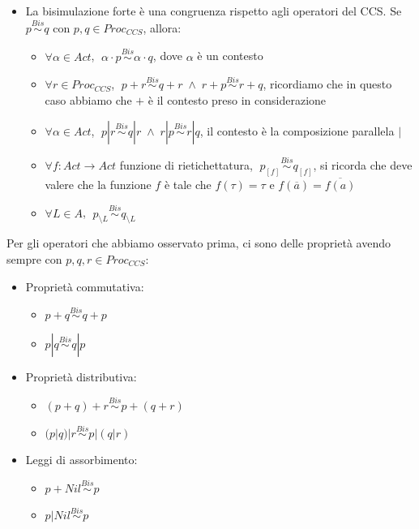 \begin{itemize}
    \item La bisimulazione forte è una congruenza rispetto agli operatori del CCS.
        Se $p \stackrel{Bis}{\sim} q$ con $p,q \in Proc_{CCS}$, allora: 
        \begin{itemize}
            \item $\forall \alpha \in Act$, $\; \alpha \cdot p \stackrel{Bis}{\sim} \alpha \cdot q$, dove $\alpha$ è un contesto
            \item $\forall r \in Proc_{CCS}$, $\; p + r \stackrel{Bis}{\sim} q +r \; \land \; r + p \stackrel{Bis}{\sim} r + q$, ricordiamo che in questo caso abbiamo che $+$ è il contesto preso in considerazione
            \item $\forall \alpha \in Act$, $\; p | r \stackrel{Bis}{\sim} q|r \; \land \; r | p \stackrel{Bis}{\sim} r | q$, il contesto è la composizione parallela $|$
            \item $\forall f : Act \to Act$ funzione di rietichettatura, $\; p_{[f]} \stackrel{Bis}{\sim} q_{[f]}$, si ricorda che deve valere che la funzione $f$ è tale che $f(\tau) = \tau$ e $f(\overline a) = \overline{f(a)}$
            \item $\forall L \in A$, $\; p_{\setminus L} \stackrel{Bis}{\sim} q_{\setminus L}$
        \end{itemize}
\end{itemize}
Per gli operatori che abbiamo osservato prima, ci sono delle proprietà avendo sempre con $p,q,r \in Proc_{CCS}$:
\begin{itemize}
    \item Proprietà commutativa: 
        \begin{itemize}
            \item $p + q \stackrel{Bis}{\sim} q + p$
            \item $p | q \stackrel{Bis}{\sim} q | p$
        \end{itemize}
    \item Proprietà distributiva:
        \begin{itemize}
          \item $(p + q) + r \stackrel{Bis}{\sim} p + (q + r)$
          \item $(p | q) | r \stackrel{Bis}{\sim} p | (q | r)$
        \end{itemize}
    \item Leggi di assorbimento:
        \begin{itemize}
          \item $p + Nil \stackrel{Bis}{\sim} p$
          \item $p | Nil \stackrel{Bis}{\sim} p$
        \end{itemize}
\end{itemize}
